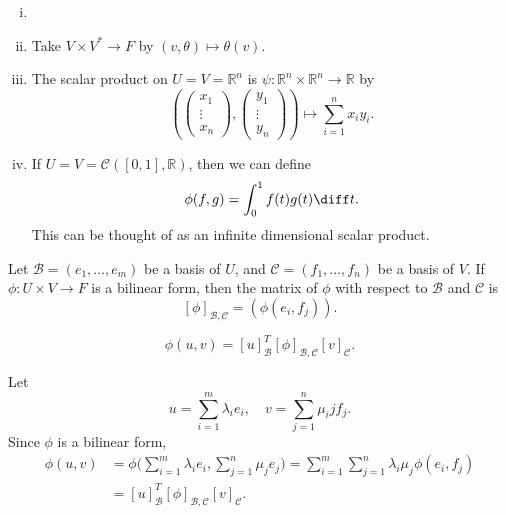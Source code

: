 \documentclass[12pt]{article}
\begin{document}
\begin{exbox}
	\begin{enumerate}[(i)]
		\item[]
		\item Take $V \times V^{\ast} \to F$ by $(v, \theta) \mapsto \theta(v)$.
		\item The scalar product on $U = V = \mathbb{R}^{n}$ is $\psi : \mathbb{R}^{n} \times \mathbb{R}^{n} \to \mathbb{R}$ by
			\[
				\left(
					\begin{pmatrix}
						x_1 \\
						\vdots \\
						x_n
					\end{pmatrix},
					\begin{pmatrix}
						y_1 \\
						\vdots \\
						y_n
					\end{pmatrix}
				\right)
				\mapsto  \sum_{i = 1}^{n} x_i y_i
			.\]
		\item If $U = V = \mathcal{C}([0, 1], \mathbb{R})$, then we can define
			\[
				\phi(f, g) = \int_{0}^{1}f(t)g(t) \diff t
			.\]
			This can be thought of as an infinite dimensional scalar product.
	\end{enumerate}
\end{exbox}

\begin{definition}
	Let $\mathcal{B} = (e_1, \ldots, e_m)$ be a basis of $U$, and $\mathcal{C} = (f_1, \ldots, f_n)$ be a basis of $V$. If $\phi : U \times V \to F$ is a bilinear form, then the matrix of $\phi$ with respect to $\mathcal{B}$ and $\mathcal{C}$ is
	\[
		[\phi]_{\mathcal{B}, \mathcal{C}} = (\phi(e_i, f_j))
	.\]
\end{definition}

\begin{lemma}
	\[
		\phi(u, v) = [u]_{\mathcal{B}}^{T} [\phi]_{\mathcal{B}, \mathcal{C}} [v]_{\mathcal{C}}
	.\]
\end{lemma}

\begin{proofbox}
	Let
\[
u = \sum_{i = 1}^{m} \lambda_i e_i, \quad v = \sum_{j = 1}^{n} \mu_ij f_j
.\]
Since $\phi$ is a bilinear form,
\begin{align*}
	\phi(u, v) &= \phi \Biggl( \sum_{i = 1}^{m} \lambda_i e_i, \sum_{j = 1}^{n} \mu_j e_j \Biggr) = \sum_{i = 1}^{m}\sum_{j = 1}^{n} \lambda_i \mu_j \phi(e_i, f_j) \\
		   &= [u]_{\mathcal{B}}^{T}[\phi]_{\mathcal{B}, \mathcal{C}}[v]_{\mathcal{C}}.
\end{align*}
\end{proofbox}
\end{document}
